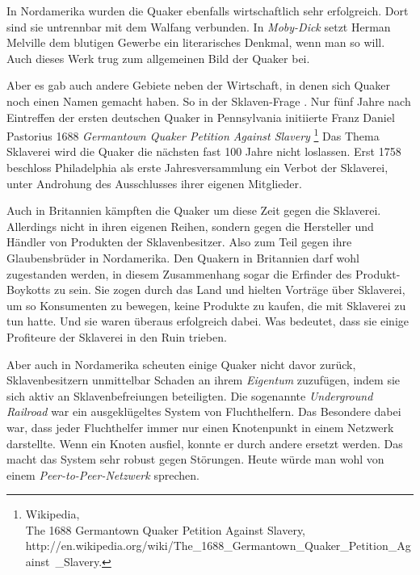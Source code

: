 \medskip

In Nordamerika wurden die Quaker ebenfalls wirtschaftlich sehr erfolgreich. Dort
sind sie untrennbar mit dem Walfang  verbunden. In
\textit{Moby-Dick} setzt
Herman Melville  dem blutigen Gewerbe ein
literarisches Denkmal, wenn man so
will. Auch dieses Werk trug zum allgemeinen Bild der Quaker bei.

\medskip

Aber es gab auch andere Gebiete neben der Wirtschaft, in denen sich Quaker noch
einen
Namen gemacht haben. So in der Sklaven-Frage . Nur fünf Jahre
nach Eintreffen
der ersten deutschen Quaker in Pennsylvania initiierte Franz Daniel Pastorius
1688 \textit{Germantown Quaker Petition Against Slavery}
\footnote{Wikipedia,
\\The 1688 Germantown Quaker Petition Against Slavery,
\\http://en.wikipedia.org/wiki/The\_1688\_Germantown\_Quaker\_Petition\_Against\
\_Slavery.} Das Thema Sklaverei wird die Quaker die nächsten fast 100 Jahre
nicht
loslassen. Erst 1758 beschloss Philadelphia  als erste
Jahresversammlung ein Verbot der Sklaverei,
unter Androhung des Ausschlusses ihrer eigenen Mitglieder.

\medskip

Auch in Britannien kämpften die Quaker um diese Zeit gegen die Sklaverei.
Allerdings nicht in ihren eigenen Reihen, sondern gegen die Hersteller
und Händler von Produkten der Sklavenbesitzer. Also zum Teil gegen ihre
Glaubensbrüder in Nordamerika. Den Quakern in Britannien darf wohl zugestanden
werden, in diesem Zusammenhang sogar die Erfinder des Produkt-Boykotts
\index{Boykott} zu sein.
Sie zogen durch das Land und hielten Vorträge über Sklaverei, um so Konsumenten
zu
bewegen, keine Produkte zu kaufen, die mit Sklaverei zu tun hatte. Und sie
waren überaus erfolgreich dabei. Was bedeutet, dass sie einige Profiteure der
Sklaverei in den Ruin trieben.

\medskip

Aber auch in Nordamerika  scheuten einige Quaker nicht
davor zurück,
Sklavenbesitzern unmittelbar Schaden an ihrem \textit{Eigentum} zuzufügen, indem
sie sich
aktiv an Sklavenbefreiungen beteiligten. Die sogenannte
\textit{Underground Railroad}  war ein
ausgeklügeltes System von Fluchthelfern. Das
Besondere dabei war, dass jeder Fluchthelfer 
immer
nur einen Knotenpunkt in einem
Netzwerk darstellte. Wenn ein Knoten ausfiel, konnte er durch andere ersetzt
werden. Das macht das System sehr robust gegen Störungen. Heute würde man
wohl
von einem \textit{Peer-to-Peer-Netzwerk} sprechen.

